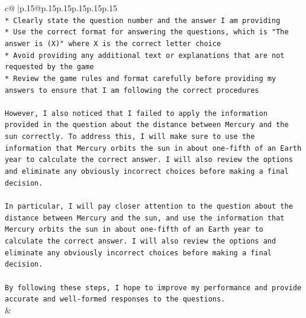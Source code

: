 \documentclass{article}
\begin{document}
{\begin{supertabular}{c@{$\;$}|p{.15\linewidth}@{}p{.15\linewidth}p{.15\linewidth}p{.15\linewidth}p{.15\linewidth}p{.15\linewidth}}
{{{\\ 
\texttt{* Clearly state the question number and the answer I am providing} \\
\texttt{* Use the correct format for answering the questions, which is "The answer is (X)" where X is the correct letter choice} \\
\texttt{* Avoid providing any additional text or explanations that are not requested by the game} \\
\texttt{* Review the game rules and format carefully before providing my answers to ensure that I am following the correct procedures} \\
\\ 
\texttt{However, I also noticed that I failed to apply the information provided in the question about the distance between Mercury and the sun correctly. To address this, I will make sure to use the information that Mercury orbits the sun in about one{-}fifth of an Earth year to calculate the correct answer. I will also review the options and eliminate any obviously incorrect choices before making a final decision.} \\
\\ 
\texttt{In particular, I will pay closer attention to the question about the distance between Mercury and the sun, and use the information that Mercury orbits the sun in about one{-}fifth of an Earth year to calculate the correct answer. I will also review the options and eliminate any obviously incorrect choices before making a final decision.} \\
\\ 
\texttt{By following these steps, I hope to improve my performance and provide accurate and well{-}formed responses to the questions.} \\
            }
        }
    }
    & \\ \\

\end{supertabular}
}
\end{document}

